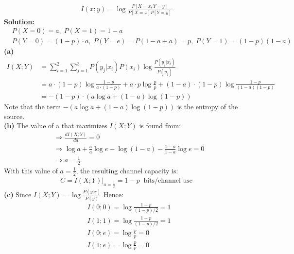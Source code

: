 \documentclass[a4paper,12pt]{article}
\begin{document}
\begin{enumerate}
\begin{align*}
                I(x;y) = \log \frac{P[X = x, Y = y]}{P[X = x]P[Y = y]}
            \end{align*}
            \textbf{Solution:}
            \begin{align*}
                & P(X = 0) = a, \; P(X = 1) = 1 - a \\
                & P(Y = 0) = (1 - p) \cdot a, \; P(Y = e) = P(1 - a + a) = p, \; P(Y = 1) = (1 - p)(1 - a)
            \end{align*}
            \textbf{(a)} 
            \begin{align*}
                I(X;Y) &= \sum_{i = 1}^{2} \sum_{j = 1}^{3} P(y_j | x_i)P(x_i) \log \frac{P(y_j | x_i)}{P(y_j)} \\ 
                       &= a \cdot (1 - p) \log \frac{1 - p}{a \cdot (1 - p)} + a \cdot p \log \frac{p}{p} + (1 - a) \cdot (1 - p) \log \frac{1 - p}{(1 - a)(1 - p)} \\ 
                       &= -(1 - p) \cdot \left(a \log a + (1 - a) \log (1 - p) \right)
            \end{align*}
            Note that the term $-\left(a \log a + (1 - a) \log (1 - p) \right)$ is the entropy of the source. \\ 
            \textbf{(b)} 
            The value of a that maximizes $I(X;Y)$ is found from:
            \begin{align*}
                & \Rightarrow \frac{dI(X;Y)}{da} = 0 \\ 
                & \Rightarrow \log a + \frac{a}{a} \log e - \log (1 - a) - \frac{1 - a}{1 - a} \log e = 0 \\ 
                & \Rightarrow a = \frac{1}{2}
            \end{align*}
            With this value of $a = \frac{1}{2}$, the resulting channel capacity is:
            \begin{align*}
                C = I(X;Y)|_{a = \frac{1}{2}} = 1 - p \;\; \text{bits/channel use} 
            \end{align*}
            \textbf{(c)} Since $I(X;Y) = \log \frac{P(y|x)}{P(y)}$ Hence:
            \begin{align*}
                & I(0;0) = \log \frac{1 - p}{(1 - p)/2} = 1 \\
                & I(1;1) = \log \frac{1 - p}{(1 - p)/2} = 1 \\
                & I(0;e) = \log \frac{p}{p} = 0 \\
                & I(1;e) = \log \frac{p}{p} = 0
            \end{align*}

\end{enumerate}
\end{document}
